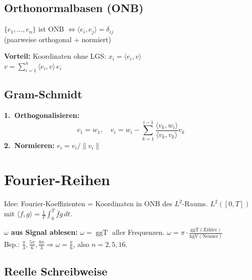 \documentclass[10pt,a4paper,twocolumn]{article}
\newcommand{\seccol}{black}
\newcommand{\setseccol}[1]{\renewcommand{\seccol}{#1}}
\newcommand{\detail}[1]{{\small\color{detail}#1}}
\begin{document}
	\subsection{Orthonormalbasen (ONB)}
	
	\begin{tcolorbox}[defbox, title={Def. 5.6.8 — ONB}]
		$\{e_1,\ldots,e_n\}$ ist ONB $\iff \langle e_i,e_j\rangle=\delta_{ij}$\\
		(paarweise orthogonal + normiert)
	\end{tcolorbox}
	
	\begin{tcolorbox}[tipbox]
		\textbf{Vorteil:} Koordinaten ohne LGS: $x_i=\langle e_i,v\rangle$\\
		$v=\sum_{i=1}^n\langle e_i,v\rangle\,e_i$
	\end{tcolorbox}
	
	\subsection{Gram-Schmidt}
	
	\begin{tcolorbox}[recbox, title={Algorithmus}]
		\textbf{1.\ Orthogonalisieren:}
		$$v_1=w_1,\quad v_i=w_i-\sum_{k=1}^{i-1}\frac{\langle v_k,w_i\rangle}{\langle v_k,v_k\rangle}v_k$$
		\textbf{2.\ Normieren:} $e_i=v_i/\|v_i\|$
	\end{tcolorbox}
	
	\setseccol{c5}
	\section{Fourier-Reihen}
	
	\detail{Idee: Fourier-Koeffizienten = Koordinaten in ONB des $L^2$-Raums. $L^2([0,T])$ mit $\langle f,g\rangle=\frac{1}{T}\int_0^T\overline{f}g\,dt$.}
	
	\begin{tcolorbox}[tipbox]
		\textbf{$\omega$ aus Signal ablesen:} $\omega=\operatorname{ggT}$ aller Frequenzen.
		$\omega=\pi\cdot\frac{\operatorname{ggT(Zähler)}}{\operatorname{kgV(Nenner)}}$\\
		\detail{Bsp.: $\frac{\pi}{3},\frac{5\pi}{6},\frac{8\pi}{3}\Rightarrow\omega=\frac{\pi}{6}$, also $n=2,5,16$.}
	\end{tcolorbox}
	
	\subsection{Reelle Schreibweise}
	
\end{document}
